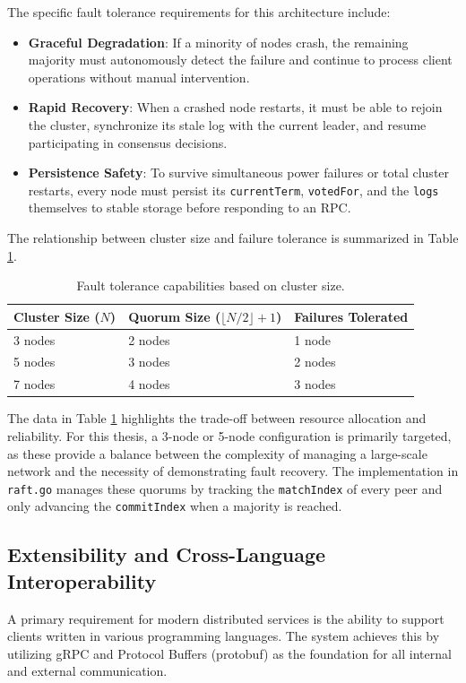 The specific fault tolerance requirements for this architecture include:
\begin{itemize}
    \item \textbf{Graceful Degradation}: If a minority of nodes crash, the remaining majority must autonomously detect the failure and continue to process client operations without manual intervention.
    \item \textbf{Rapid Recovery}: When a crashed node restarts, it must be able to rejoin the cluster, synchronize its stale log with the current leader, and resume participating in consensus decisions.
    \item \textbf{Persistence Safety}: To survive simultaneous power failures or total cluster restarts, every node must persist its \texttt{currentTerm}, \texttt{votedFor}, and the \texttt{logs} themselves to stable storage before responding to an RPC.
\end{itemize}

The relationship between cluster size and failure tolerance is summarized in Table \ref{tab:fault_tolerance}.

\begin{table}[h]
\centering
\caption{Fault tolerance capabilities based on cluster size.}
\label{tab:fault_tolerance}
\begin{tabular}{|l|l|l|}
\hline
\textbf{Cluster Size ($N$)} & \textbf{Quorum Size ($\lfloor N/2 \rfloor + 1$)} & \textbf{Failures Tolerated} \\ \hline
3 nodes & 2 nodes & 1 node \\ \hline
5 nodes & 3 nodes & 2 nodes \\ \hline
7 nodes & 4 nodes & 3 nodes \\ \hline
\end{tabular}
\end{table}

The data in Table \ref{tab:fault_tolerance} highlights the trade-off between resource allocation and reliability. For this thesis, a 3-node or 5-node configuration is primarily targeted, as these provide a balance between the complexity of managing a large-scale network and the necessity of demonstrating fault recovery. The implementation in \texttt{raft.go} manages these quorums by tracking the \texttt{matchIndex} of every peer and only advancing the \texttt{commitIndex} when a majority is reached.

\subsection{Extensibility and Cross-Language Interoperability}
A primary requirement for modern distributed services is the ability to support clients written in various programming languages. The system achieves this by utilizing gRPC and Protocol Buffers (protobuf) as the foundation for all internal and external communication.

